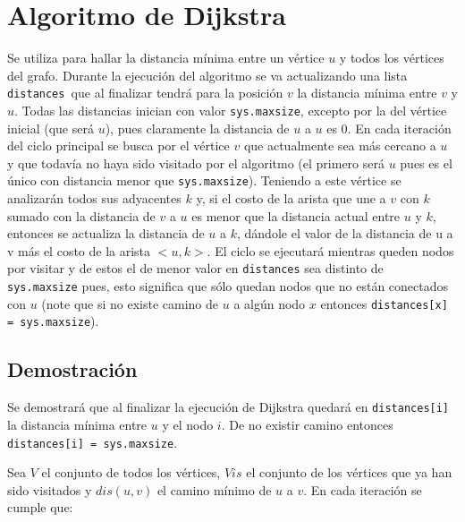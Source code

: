 \documentclass[a4paper,12pt,twocolumn]{article}
\begin{document}



\section{Algoritmo de Dijkstra}

 Se utiliza para hallar la distancia mínima entre un vértice $u$ y todos los vértices del grafo. Durante la ejecución del algoritmo se va actualizando una lista \texttt{\ttfamily distances }que al finalizar tendrá para la posición $v$ la distancia mínima entre $v$ y $u$. Todas las distancias inician con valor \texttt{\ttfamily sys.maxsize}, excepto por la del vértice inicial (que será $u$), pues claramente la distancia de $u$ a $u$ es 0. En cada iteración del ciclo principal se busca por el vértice $v$ que actualmente sea más cercano a $u$ y que todavía no haya sido visitado por el algoritmo (el primero será $u$ pues es el único con distancia menor que \texttt{\ttfamily sys.maxsize}). Teniendo a este vértice se analizarán todos sus adyacentes $k$ y, si el costo de la arista que une a $v$ con $k$ sumado con la distancia de $v$ a $u$ es menor que la distancia actual entre $u$ y $k$, entonces se actualiza la distancia de $u$ a $k$, dándole el valor de la distancia de u a v más el costo de la arista $<u, k>$. El ciclo se ejecutará mientras queden nodos por visitar y de estos el de menor valor en \texttt{\ttfamily distances} sea distinto de \texttt{\ttfamily sys.maxsize} pues, esto significa que sólo quedan nodos que no están conectados con $u$ (note que si no existe camino de $u$ a algún nodo $x$ entonces \texttt{\ttfamily distances[x] = sys.maxsize}).


	\subsection{Demostración}

		Se demostrará que al finalizar la ejecución de Dijkstra quedará en  \texttt{\ttfamily distances[i]} la distancia mínima entre $u$ y el nodo $i$. De no existir camino entonces \texttt{\ttfamily distances[i] = sys.maxsize}.
		
		Sea $V$ el conjunto de todos los vértices, $Vis$ el conjunto de los vértices que ya han sido visitados y $dis(u,v)$ el camino mínimo de $u$ a $v$. En cada iteración se cumple que:
\end{document}
